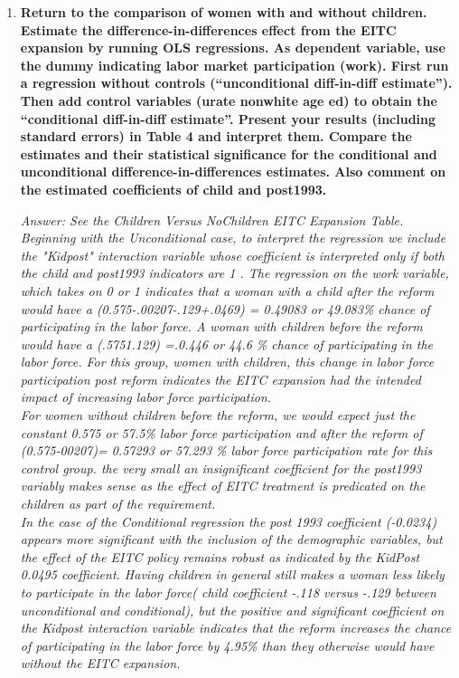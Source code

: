 \documentclass{article}
\begin{document}
\begin{enumerate}
\item \textbf{ Return to the comparison of women with and without children. Estimate the difference-in-differences effect from the EITC expansion by running OLS regressions. As dependent variable, use the dummy indicating labor market participation (work). First run a regression without controls (“unconditional diff-in-diff estimate”). Then add control variables (urate nonwhite age ed) to obtain the “conditional diff-in-diff estimate”. Present your results (including standard errors) in Table 4 and interpret them. Compare the estimates and their statistical significance for the conditional and unconditional difference-in-differences estimates. Also comment on the estimated coefficients of child and post1993.  }


\textit{Answer: See the Children Versus NoChildren EITC Expansion Table. Beginning with the Unconditional case, to interpret the regression we include the "Kidpost" interaction variable whose coefficient is interpreted only if both the child and post1993 indicators are 1 . The regression on the work variable, which takes on 0 or 1 indicates that a woman with a child after the reform would have a (0.575-.00207-.129+.0469) = 0.49083 or 49.083\% chance of participating in the labor force. A woman with children before the reform would have a (.5751.129) =.0.446 or 44.6 \% chance of participating in the labor force. For this group, women with children, this change in labor force participation post reform indicates the EITC expansion had the intended impact of increasing labor force participation.} \\

\textit{For women without children before the reform, we would expect just the constant 0.575 or 57.5\% labor force participation and after the reform of (0.575-00207)= 0.57293 or 57.293 \% labor force participation rate for this control group. the very small an insignificant coefficient for the post1993 variably makes sense as the effect of EITC treatment is predicated on the children as part of the requirement. }\\

\textit{In the case of the Conditional regression the post 1993 coefficient (-0.0234) appears more significant with the inclusion of the demographic variables, but the effect of the EITC policy remains robust as indicated by the KidPost 0.0495 coefficient. Having children in general still makes a woman less likely to participate in the labor force( child coefficient -.118 versus -.129 between unconditional and conditional), but the positive and significant coefficient on the Kidpost interaction variable indicates that the reform increases the chance of participating in the labor force by 4.95\% than they otherwise would have without the EITC expansion.}


\end{enumerate}
\end{document}
